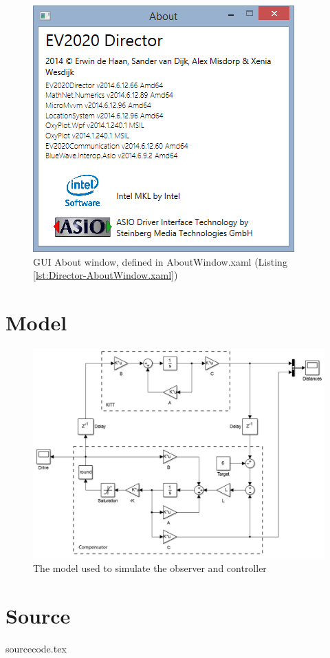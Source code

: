 \documentclass[final]{scrreprt} %
\begin{document}
\begin{appendices}
\begin{figure}[h]
\centering
	\includegraphics[width=0.5\linewidth]{resources/UI-About.png}
	\caption{GUI About window, defined in AboutWindow.xaml (Listing \ref{lst:Director-AboutWindow.xaml})}
	\label{fig:UI-About}
\end{figure}

\chapter{Model}
\label{app:model}
\begin{figure}[H]
	\centering    	
    	\includegraphics[width=\textwidth]{resources/model.png}
    	\caption{The model used to simulate the observer and controller}
    	\label{app:model}
\end{figure}

\chapter{Source}
\label{app:source}
{sourcecode.tex}

\end{appendices}
\end{document}
